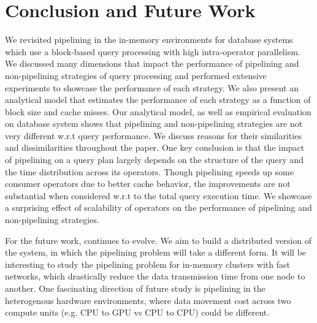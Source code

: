 \section{Conclusion and Future Work}\label{sec:conclusions}
We revisited pipelining in the in-memory environments for database systems which use a block-based query processing with high intra-operator parallelism.
We discussed many dimensions that impact the performance of pipelining and non-pipelining strategies of query processing and performed extensive experiments to showcase the performance of each strategy.
We also present an analytical model that estimates the performance of each strategy as a function of block size and cache misses. 
Our analytical model, as well as empirical evaluation on \sys{} database system shows that pipelining and non-pipelining strategies are not very different w.r.t query performance. 
We discuss reasons for their similarities and dissimilarities throughout the paper. 
One key conslusion is that the impact of pipelining on a query plan largely depends on the structure of the query and the time distribution across its operators.
Though pipelining speeds up some consumer operators due to better cache behavior, the improvements are not substantial when considered w.r.t to the total query execution time.
We showcase a surprising effect of scalability of operators on the performance of pipelining and non-pipelining strategies.

For the future work, \sys{} continues to evolve.
We aim to build a distributed version of the system, in which the pipelining problem will take a different form.
It will be interesting to study the pipelining problem for in-memory clusters with fast networks, which drastically reduce the data transmission time from one node to another. 
One fascinating direction of future study is pipelining in the heterogenous hardware environments, where data movement cost across two compute units (e.g. CPU to GPU vs CPU to CPU) could be different. 
